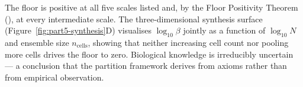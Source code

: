 The floor is positive at all five scales listed and, by the Floor Positivity
Theorem (), at every intermediate scale.  The
three-dimensional synthesis surface (Figure~\ref{fig:part5-synthesis}D)
visualises $\log_{10}\beta$ jointly as a function of $\log_{10} N$ and ensemble
size $n_{\mathrm{cells}}$, showing that neither increasing cell count nor
pooling more cells drives the floor to zero.  Biological knowledge is
irreducibly uncertain — a conclusion that the partition framework derives from
axioms rather than from empirical observation.

